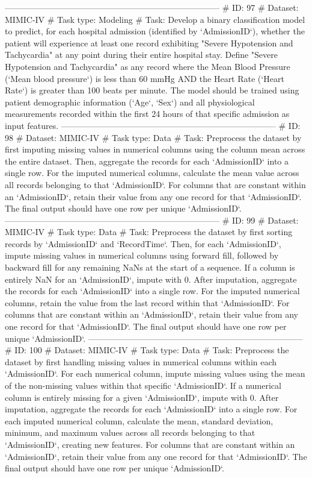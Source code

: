 \begin{tcolorbox}[colback=cadmiumgreen!5!white,colframe=forestgreen!75!white,breakable,title=\textit{Generated analytical tasks in task 4.}]
\begin{VerbatimWrap}
-----------------------------------------------------------------------------
# ID: 97  
# Dataset: MIMIC-IV 
# Task type: Modeling
# Task: Develop a binary classification model to predict, for each hospital admission (identified by `AdmissionID`), whether the patient will experience at least one record exhibiting "Severe Hypotension and Tachycardia" at any point during their entire hospital stay. Define "Severe Hypotension and Tachycardia" as any record where the Mean Blood Pressure (`Mean blood pressure`) is less than 60 mmHg AND the Heart Rate (`Heart Rate`) is greater than 100 beats per minute. The model should be trained using patient demographic information (`Age`, `Sex`) and all physiological measurements recorded within the first 24 hours of that specific admission as input features.
-----------------------------------------------------------------------------
# ID: 98  
# Dataset: MIMIC-IV 
# Task type: Data
# Task: Preprocess the dataset by first imputing missing values in numerical columns using the column mean across the entire dataset. Then, aggregate the records for each `AdmissionID` into a single row. For the imputed numerical columns, calculate the mean value across all records belonging to that `AdmissionID`. For columns that are constant within an `AdmissionID`, retain their value from any one record for that `AdmissionID`. The final output should have one row per unique `AdmissionID`.
-----------------------------------------------------------------------------
# ID: 99  
# Dataset: MIMIC-IV 
# Task type: Data
# Task: Preprocess the dataset by first sorting records by `AdmissionID` and `RecordTime`. Then, for each `AdmissionID`, impute missing values in numerical columns using forward fill, followed by backward fill for any remaining NaNs at the start of a sequence. If a column is entirely NaN for an `AdmissionID`, impute with 0. After imputation, aggregate the records for each `AdmissionID` into a single row. For the imputed numerical columns, retain the value from the last record within that `AdmissionID`. For columns that are constant within an `AdmissionID`, retain their value from any one record for that `AdmissionID`. The final output should have one row per unique `AdmissionID`.
-----------------------------------------------------------------------------
# ID: 100  
# Dataset: MIMIC-IV 
# Task type: Data
# Task: Preprocess the dataset by first handling missing values in numerical columns within each `AdmissionID`. For each numerical column, impute missing values using the mean of the non-missing values within that specific `AdmissionID`. If a numerical column is entirely missing for a given `AdmissionID`, impute with 0. After imputation, aggregate the records for each `AdmissionID` into a single row. For each imputed numerical column, calculate the mean, standard deviation, minimum, and maximum values across all records belonging to that `AdmissionID`, creating new features. For columns that are constant within an `AdmissionID`, retain their value from any one record for that `AdmissionID`. The final output should have one row per unique `AdmissionID`.

\end{VerbatimWrap}
\end{tcolorbox}
